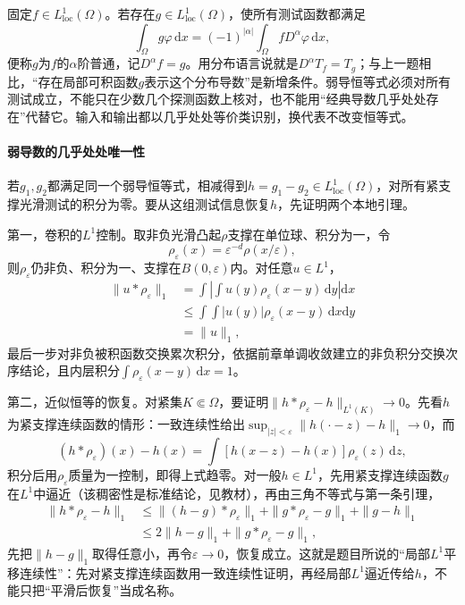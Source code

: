固定$f\in L^1_{\mathrm{loc}}(\Omega)$。若存在$g\in L^1_{\mathrm{loc}}(\Omega)$，使所有测试函数都满足
\begin{equation}
  \int_\Omega g\varphi\,\mathrm dx
  =(-1)^{|\alpha|}\int_\Omega fD^\alpha\varphi\,\mathrm dx,
  \label{eq:functional-weak-derivative}
\end{equation}
便称$g$为$f$的$\alpha$阶普通，记$D^\alpha f=g$。用分布语言说就是$D^\alpha T_f=T_g$；与上一题相比，“存在局部可积函数$g$表示这个分布导数”是新增条件。弱导恒等式必须对所有测试成立，不能只在少数几个探测函数上核对，也不能用“经典导数几乎处处存在”代替它。输入和输出都以几乎处处等价类识别，换代表不改变恒等式。

\paragraph{弱导数的几乎处处唯一性}

若$g_1,g_2$都满足同一个弱导恒等式，相减得到$h=g_1-g_2\in L^1_{\mathrm{loc}}(\Omega)$，对所有紧支撑光滑测试的积分为零。要从这组测试信息恢复$h$，先证明两个本地引理。

第一，卷积的$L^1$控制。取非负光滑凸起$\rho$支撑在单位球、积分为一，令
\[
  \rho_\varepsilon(x)=\varepsilon^{-d}\rho(x/\varepsilon),
\]
则$\rho_\varepsilon$仍非负、积分为一、支撑在$B(0,\varepsilon)$内。对任意$u\in L^1$，
\[
\begin{aligned}
  \|u*\rho_\varepsilon\|_1
  &=\int\left|\int u(y)\rho_\varepsilon(x-y)\,\mathrm dy\right|\mathrm dx\\
  &\le\int\int|u(y)|\rho_\varepsilon(x-y)\,\mathrm dx\mathrm dy\\
  &=\|u\|_1,
\end{aligned}
\]
最后一步对非负被积函数交换累次积分，依据前章单调收敛建立的非负积分交换次序结论，且内层积分$\int\rho_\varepsilon(x-y)\,\mathrm dx=1$。

第二，近似恒等的恢复。对紧集$K\Subset\Omega$，要证明$\|h*\rho_\varepsilon-h\|_{L^1(K)}\to0$。先看$h$为紧支撑连续函数的情形：一致连续性给出$\sup_{|z|<\varepsilon}\|h(\cdot-z)-h\|_1\to0$，而
\[
  (h*\rho_\varepsilon)(x)-h(x)=\int[h(x-z)-h(x)]\rho_\varepsilon(z)\,\mathrm dz,
\]
积分后用$\rho_\varepsilon$质量为一控制，即得上式趋零。对一般$h\in L^1$，先用紧支撑连续函数$g$在$L^1$中逼近（该稠密性是标准结论，见教材），再由三角不等式与第一条引理，
\[
\begin{aligned}
  \|h*\rho_\varepsilon-h\|_1
  &\le\|(h-g)*\rho_\varepsilon\|_1+\|g*\rho_\varepsilon-g\|_1+\|g-h\|_1\\
  &\le2\|h-g\|_1+\|g*\rho_\varepsilon-g\|_1,
\end{aligned}
\]
先把$\|h-g\|_1$取得任意小，再令$\varepsilon\to0$，恢复成立。这就是题目所说的“局部$L^1$平移连续性”：先对紧支撑连续函数用一致连续性证明，再经局部$L^1$逼近传给$h$，不能只把“平滑后恢复”当成名称。

